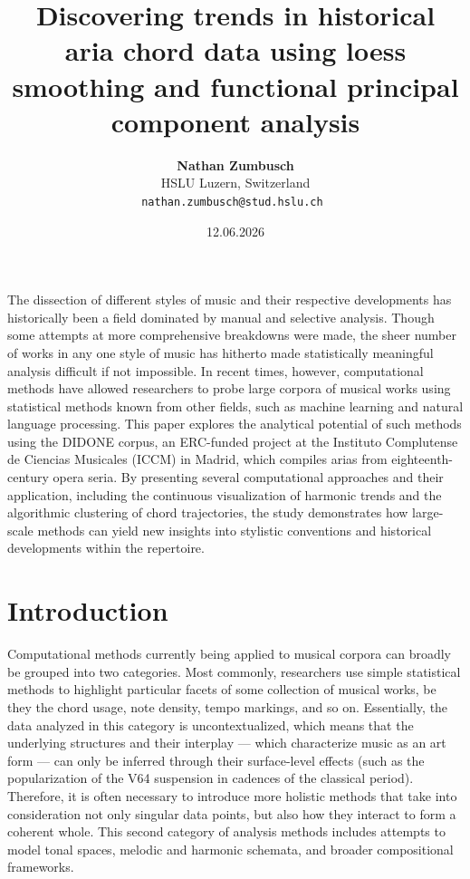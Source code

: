 \documentclass[10pt,a4paper,twocolumn]{article}
\title{Discovering trends in historical aria chord data using loess smoothing and functional principal component analysis}
\author{
    \textbf{Nathan Zumbusch} \\
    HSLU Luzern, Switzerland \\
    {\tt nathan.zumbusch@stud.hslu.ch }
}
\date{12.06.2026}
\renewenvironment{abstract}
 {\small
  \begin{center}
  \bfseries \abstractname\vspace{-.5em}\vspace{0pt}
  \end{center}
  \itshape
 }
 {\par\vspace{1em}}
\begin{document}
\maketitle


\begin{abstract}
The dissection of different styles of music and their respective developments has historically been a field dominated by manual and selective analysis. Though some attempts at more comprehensive breakdowns were made, the sheer number of works in any one style of music has hitherto made statistically meaningful analysis difficult if not impossible. In recent times, however, computational methods have allowed researchers to probe large corpora of musical works using statistical methods known from other fields, such as machine learning and natural language processing. This paper explores the analytical potential of such methods using the DIDONE corpus, an ERC-funded project at the Instituto Complutense de Ciencias Musicales (ICCM) in Madrid, which compiles arias from eighteenth-century opera seria. By presenting several computational approaches and their application, including the continuous visualization of harmonic trends and the algorithmic clustering of chord trajectories, the study demonstrates how large-scale methods can yield new insights into stylistic conventions and historical developments within the repertoire.
\end{abstract}

\section{Introduction}\label{sec:intro}
Computational methods currently being applied to musical corpora can broadly be grouped into two categories. Most commonly, researchers use simple statistical methods to highlight particular facets of some collection of musical works, be they the chord usage, note density, tempo markings, and so on. Essentially, the data analyzed in this category is uncontextualized, which means that the underlying structures and their interplay --- which characterize music as an art form --- can only be inferred through their surface-level effects (such as the popularization of the V64 suspension in cadences of the classical period). Therefore, it is often necessary to introduce more holistic methods that take into consideration not only singular data points, but also how they interact to form a coherent whole. This second category of analysis methods includes attempts to model tonal spaces, melodic and harmonic schemata, and broader compositional frameworks.
\end{document}
